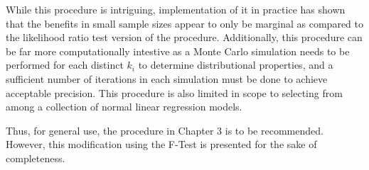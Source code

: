 While this procedure is intriguing, implementation of it in practice has shown that the benefits in small sample sizes appear to only be
marginal as compared to the likelihood ratio test version of the procedure. Additionally, this procedure can be far more computationally
intestive as a Monte Carlo simulation needs to be performed for each distinct $k_i$ to determine distributional properties, and a sufficient
number of iterations in each simulation must be done to achieve acceptable precision. This procedure is also limited in scope to selecting
from among a collection of normal linear regression models.

Thus, for general use, the procedure in Chapter 3 is to be recommended. However, this modification using the F-Test is presented for the
sake of completeness.


